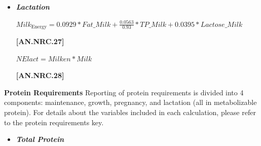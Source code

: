 \begin{refsection}
\begin{itemize}
\textit{\small Otherwise}

\vspace{0.5cm}
            {\raggedleft \textbf{[AN.NRC.25]}\par}
\vspace{0.2cm}

\begin{center}
    \(NEpreg = MEpreg * 0.664\)
\end{center}

\vspace{0.5cm}
            {\raggedleft \textbf{[AN.NRC.26]}\par}

\vspace{0.5cm}



        \item \textbf{\textit{Lactation}}
\vspace{0.2cm}

\begin{center}
    \(Milk_{\text{Energy}} = 0.0929 * Fat\_Milk + \frac{0.0563}{0.93} * TP\_Milk + 0.0395 * Lactose\_Milk\)
\end{center}

\vspace{0.5cm}
            {\raggedleft \textbf{[AN.NRC.27]}\par}

\vspace{0.2cm}

\begin{center}
    \(NElact = Milken * Milk\)
\end{center}

\vspace{0.5cm}
            {\raggedleft \textbf{[AN.NRC.28]}\par}
            
\vspace{0.5cm}


    \end{itemize}

    
    \textbf{ Protein Requirements} Reporting of protein requirements is divided into 4 components: maintenance, growth, pregnancy, and lactation (all in metabolizable protein). For details about the variables included in each calculation, please refer to the protein requirements key.
    \vspace{0.2cm}

    \begin{itemize}
                \item \textbf{\textit{Total Protein}}
\vspace{0.2cm}


\end{itemize}
\end{refsection}
